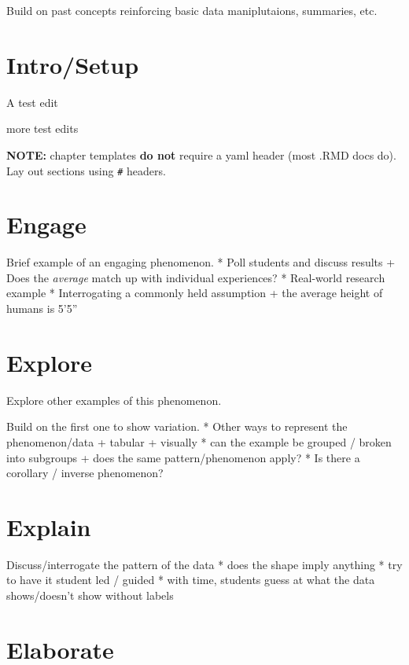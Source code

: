 \documentclass[
]{book}
\begin{document}
Build on past concepts reinforcing basic data maniplutaions, summaries, etc.

\hypertarget{introsetup-1}{%
\chapter{Intro/Setup}\label{introsetup-1}}

A test edit

more test edits

\textbf{NOTE:} chapter templates \textbf{do not} require a yaml header (most .RMD docs do). Lay out sections using \texttt{\#} headers.

\hypertarget{engage-1}{%
\chapter{Engage}\label{engage-1}}

Brief example of an engaging phenomenon.
* Poll students and discuss results
+ Does the \emph{average} match up with individual experiences?
* Real-world research example
* Interrogating a commonly held assumption
+ the average height of humans is 5'5''

\hypertarget{explore-1}{%
\chapter{Explore}\label{explore-1}}

Explore other examples of this phenomenon.

Build on the first one to show variation.
* Other ways to represent the phenomenon/data
+ tabular
+ visually
* can the example be grouped / broken into subgroups
+ does the same pattern/phenomenon apply?
* Is there a corollary / inverse phenomenon?

\hypertarget{explain-1}{%
\chapter{Explain}\label{explain-1}}

Discuss/interrogate the pattern of the data
* does the shape imply anything
* try to have it student led / guided
* with time, students guess at what the data shows/doesn't show without labels

\hypertarget{elaborate-1}{%
\chapter{Elaborate}\label{elaborate-1}}
\end{document}
